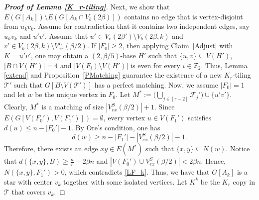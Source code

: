 \documentclass[11pt, a4paper]{article}
\theoremstyle{definition}
\newcommand{\<}{\subseteq}
\begin{document}
\begin{proof}[\bf Proof of Lemma \ref{K_r-tiling}]
Next, we show that $E(G[A_k])\setminus E(G[A_k\cap V_b(2\beta)])$ contains no edge that is vertex-disjoint from $u_kv_k$. Assume for contradiction that it contains two independent edges, say $u_kv_k$ and $u'v'$. 
Assume that $u'\in V_e(2\beta')\setminus V_b(2\beta,k)$ and  $v'\in V_b(2\beta,k)\setminus V_{ex}^L(\beta/2)$.  %
If $|F_0|\geq 2$, then applying Claim~\ref{Adjust} with $K=u'v'$, one may obtain a $(2,\beta/5)$-base $H'$ such that $\{u,v\}\subseteq V(H')$, $|B\cap V(H')|=4$ and $|V(F_i)\setminus V(H')|$ is even for every $i\in \mathbb{Z}_2$. %
Thus,  Lemma \ref{extend} and Proposition~\ref{PMatching} guarantee the existence of a new $K_r$-tiling $\mathcal{T}'$ such that $G[B\setminus V(\mathcal{T}')]$ has a  perfect matching. 
{Now, we assume $|F_0|=1$ and let $w$ be the unique vertex in $F_0$. Let $M^*:=\big(\bigcup_{j\in[r-2]}\mathcal{F}_j'\big)\cup \{u'v'\}$. Clearly,  $M^*$ is a matching of size $|V_{ex}^S(\beta/2)|+1$. %
Since $E(G[V(F_0'),V(F_1')])=\emptyset$, every vertex $u\in V(F_1')$ satisfies $d(u)\le n-|F_0'|-1$. %
By Ore's condition, one has 
$$d(w)\ge n-|F_1'|-|V_{ex}^S(\beta/2)|-1.$$
Therefore, there exists  an edge $xy\in E(M^*)$ such that $\{x,y\}\subseteq N(w)$.  %
Notice that $d(\{x,y\},B)\ge \frac{n}{r}-2\beta n$ and $|V(F_0')\cup V_{ex}^S(\beta/2)|<2\beta n$. Hence, $N(\{x,y\},F_1')>0$, which contradicts  \eqref{LF_k}.} Thus, we have that $G[A_k]$ is a star with center $v_k$ together with  some isolated vertices. Let $K^k$ be the $K_r$ copy in $\mathcal{T}$ that covers $v_k$.


\end{proof}
\end{document}

